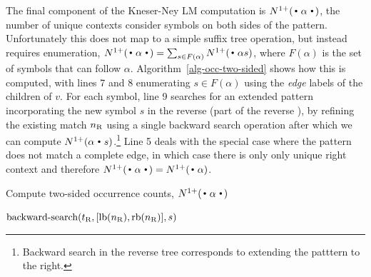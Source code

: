 The final component of the Kneser-Ney LM computation is
$\nlplus{\dotpatdot}$, the number of unique contexts consider symbols
on both sides of the pattern. 
Unfortunately this does not map to a simple suffix tree operation,
but instead requires enumeration,
$\nlplus{\dotpatdot} = \sum_{s \in F(\alpha)} \nlplus{\dotpat s}$, 
where $F(\alpha)$ is the set of symbols that can follow $\alpha$.
Algorithm~\ref{alg-occ-two-sided} shows how this is computed, with lines 7 and 8 enumerating $s \in F(\alpha)$ using the \emph{edge} labels of the children of $v$.
For each symbol, line 9 searches for an extended pattern incorporating the new symbol $s$ in the reverse \CSA (part of the reverse \CST), by refining the existing match $n_{\text{R}}$ using a single backward search operation after which we can compute $\nlplus{\patdot s}$.\footnote{Backward search in the reverse tree corresponds to extending the patttern to the right.}
Line 5 deals with the special case where the pattern does not match a complete edge, in which case there is only only unique right context and therefore $\nlplus{\dotpatdot} = \nlplus{\dotpat}$.

\begin{algorithm}[t]
  \caption{Compute two-sided occurrence counts, $\nlplus{\dotpatdot}$ 
    \label{alg:n1plusfb}}
  \begin{algorithmic}[1]
        \Else
           \For{$\chf \gets \children{\tf}{\nf}$} 
              \Let{$\chr$}{}
                  \Statex \hfill $\text{backward-search}(t_{\text{R}}, [\text{lb}(n_{\text{R}}),\text{rb}(n_{\text{R}})], s)$ %
            \EndFor
        \EndIf
      \State {}
    \EndFunction
  \end{algorithmic}
\label{alg-occ-two-sided}
\end{algorithm}

